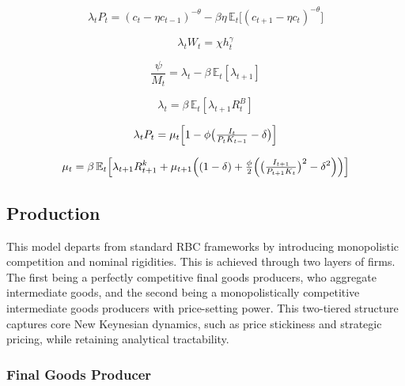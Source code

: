 \documentclass[11pt,preprint]{elsarticle}
\numberwithin{equation}{section}
\numberwithin{figure}{section}
\numberwithin{table}{section}
\begin{document}
\begin{equation}\label{foc_C}
{
  \lambda_t P_t = (c_t-\eta c_{t-1})^{-\theta} - \beta\eta\,\mathbb{E}_t\bigl[(c_{t+1}-\eta c_t)^{-\theta}\bigr]
}
\end{equation}

\begin{equation}\label{foc_h}
{\lambda_t W_t = \chi h_t^{\gamma}}
\end{equation}

\begin{equation}\label{foc_M}
{\frac{\psi}{M_t} = \lambda_t - \beta\,\mathbb{E}_t[\lambda_{t+1}]}
\end{equation}

\begin{equation}\label{foc_B}
{\lambda_t = \beta\,\mathbb{E}_t[\lambda_{t+1}R^B_t]}
\end{equation}

\begin{equation}\label{foc_I}
{\lambda_t P_t = \mu_t 
  \Bigl[ 1 - \phi \bigl( \tfrac{I_t}{P_t K_{t-1}} - \delta \bigr) \Bigr]}
\end{equation}

\begin{equation}\label{foc_K}
{\mu_t = \beta\,\mathbb{E}_t\Bigl[
        \lambda_{t+1}R^k_{t+1}
      + \mu_{t+1}\Bigl(
          (1-\delta)
        + \tfrac{\phi}{2}\Bigl(
            \bigl(\tfrac{I_{t+1}}{P_{t+1}K_t}\bigr)^2
          - \delta^2
          \Bigr)
        \Bigr)
      \Bigr]}  
\end{equation}

\newpage

\subsection{Production}\label{production}

This model departs from standard RBC frameworks by introducing
monopolistic competition and nominal rigidities. This is achieved
through two layers of firms. The first being a perfectly competitive
final goods producers, who aggregate intermediate goods, and the second
being a monopolistically competitive intermediate goods producers with
price-setting power. This two-tiered structure captures core New
Keynesian dynamics, such as price stickiness and strategic pricing,
while retaining analytical tractability.

\subsubsection{Final Goods Producer}\label{final-goods-producer}
\end{document}
